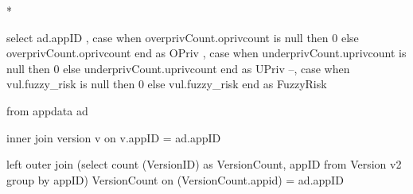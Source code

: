 \documentclass{sig-alternate}
\begin{document}


%


%		






\/* 


select ad.appID
, case when overprivCount.oprivcount is null then 0 else overprivCount.oprivcount end as OPriv
, case when underprivCount.uprivcount is null then 0 else underprivCount.uprivcount end as UPriv
--, case when vul.fuzzy_risk is null then 0 else vul.fuzzy_risk end as FuzzyRisk


from appdata ad

inner join version v on v.appID = ad.appID

left outer join (select count (VersionID) as VersionCount, appID from Version v2 group by appID) VersionCount on (VersionCount.appid) = ad.appID
\end{document}

